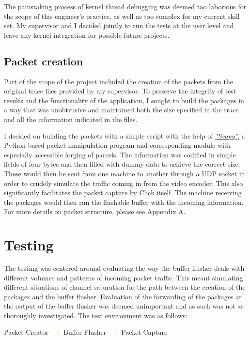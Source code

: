 The painstaking process of kernel thread debugging was deemed too laborious for the scope of this engineer's practice, as well as too complex for my current skill set. My supervisor and I decided jointly to run the tests at the user level and leave any kernel integration for possible future projects.

\section{Packet creation}

Part of the scope of the project included the creation of the packets from the original trace files provided by my supervisor. To preserve the integrity of test results and the functionality of the application, I sought to build the packages in a way that was unobtrusive and maintained both the size specified in the trace and all the information indicated in the files. 

I decided on building the packets with a simple script with the help of \href{http://www.secdev.org/projects/scapy/}{\textit{"Scapy"}}, a Python-based packet manipulation program and corresponding module with especially accessible forging of parcels. The information was codified in simple fields of four bytes and then filled with dummy data to achieve the correct size. These would then be sent from one machine to another through a UDP socket in order to crudely simulate the traffic coming in from the video encoder. This also significantly facilitates the packet capture by Click itself. The machine receiving the packages would then run the flushable buffer with the incoming information. For more details on packet structure, please see Appendix A.


\chapter{Testing}

The testing was centered around evaluating the way the buffer flusher deals with different volumes and patterns of incoming packet traffic. This meant simulating different situations of channel saturation for the path between the creation of the packages and the buffer flusher. Evaluation of the forwarding of the packages at the output of the buffer flusher was deemed unimportant and as such was not as thoroughly investigated. The test environment was as follows:
\vspace{3mm}
\begin{center}
Packet Creator \textcolor{orange}{$\rightarrow$} Buffer Flusher \textcolor{violet}{$\rightarrow$} Packet Capture
\end{center}
\vspace{3mm}

